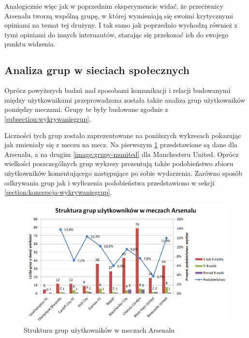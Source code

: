 Analogicznie więc jak w poprzednim eksperymencie widać, że przeciwnicy
Arsenalu tworzą wspólną grupę, w której wymieniają się swoimi
krytycznymi opiniami na temat tej drużyny. I tak samo jak poprzednio
wychodzą również z tymi opiniami do innych internautów, starając się
przekonać ich do swojego punktu widzenia.
















\subsection{Analiza grup w sieciach społecznych}
\label{subsection:strukturagrup}
Oprócz powyższych badań nad sposobami komunikacji i relacji budowanymi między
użytkownikami przeprowadzona została także analiza grup użytkowników 
pomiędzy meczami. Grupy te były budowane zgodnie z \ref{subsection:wykrywaniegrup}. 

Liczności tych grup zostało zaprezentowane na poniższych
wykresach pokazując jak zmieniały się z meczu na mecz.
Na pierwszym \ref{image:grupy-arsenal} przedstawione są dane
dla Arsenalu, a na drugim \ref{image:grupy-munited} dla Manchesteru United.
Oprócz wielkości poszczególnych grup wykresy prezentują także podobieństwo
zbioru użytkowników komentującego następujące po sobie wydarzenia.
Zarówno sposób odkrywania grup jak i wyliczenia podobieństwa przedstawiono
w sekcji \ref{section:koncepcja-wykrywaniegrup}.  
 
\begin{figure}[ht!]
\centering
\includegraphics[width=160mm]{img/grupy-arsenal-nums.png}
\caption{Struktura grup użytkowników w meczach Arsenalu}
\label{image:grupy-arsenal}
\end{figure}

